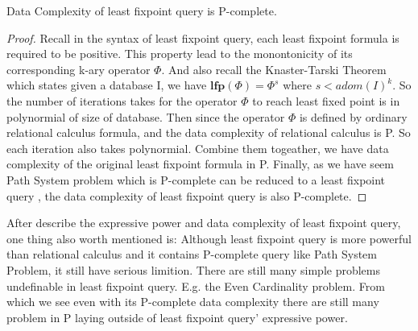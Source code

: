 \begin{claim}
Data Complexity of least fixpoint query is P-complete.
\end{claim}
\begin{proof}
Recall in the syntax of least fixpoint query, each least fixpoint formula is required to be positive. This property lead to the monontonicity of its corresponding k-ary operator $\Phi$. And also recall the Knaster-Tarski Theorem which states given a database I, we have $\textbf{lfp}(\Phi)=\Phi^s$ where $s<adom(I)^k$. So the number of iterations takes for the operator $\Phi$ to reach least fixed point is in polynormial of size of database. Then since the operator $\Phi$ is defined by ordinary relational calculus formula, and the data complexity of relational calculus is P. So each iteration also takes polynormial. Combine them togeather, we have data complexity of the original least fixpoint formula in P. Finally, as we have seem Path System problem which is P-complete can be reduced to a least fixpoint query , the data complexity of least fixpoint query is also P-complete. 
\end{proof}

After describe the expressive power and data complexity of least fixpoint query, one thing also worth mentioned is: Although least fixpoint query is more powerful than relational calculus and it contains P-complete query like Path System Problem, it still have serious limition. There are still many simple problems undefinable in least fixpoint query. E.g. the Even Cardinality problem\cite{kolaitis1}. From which we see even with its P-complete data complexity there are still many problem in P laying outside of least fixpoint query' expressive power.